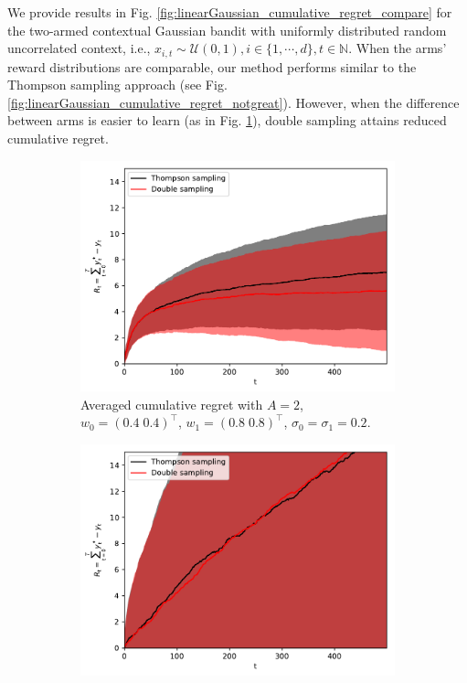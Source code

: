 \documentclass{article}
\def \Natural{{\mathbb N}}
\newcommand{\ie}{i.e., }
\newcommand{\U}{\mathcal{U}}
\begin{document}
We provide results in Fig. \ref{fig:linearGaussian_cumulative_regret_compare} for the two-armed contextual Gaussian bandit with uniformly distributed random uncorrelated context, \ie $x_{i,t}\sim \U(0,1), i \in \{1, \cdots, d\}, t \in \Natural$. When the arms' reward distributions are comparable, our method performs similar to the Thompson sampling approach (see Fig. \ref{fig:linearGaussian_cumulative_regret_notgreat}). However, when the difference between arms is easier to learn (as in Fig. \ref{fig:linearGaussian_cumulative_regret_great}), double sampling attains reduced cumulative regret.

\begin{figure}[!h]
	\centering
	\begin{subfigure}[b]{0.5\textwidth}
		\includegraphics[width=\textwidth]{./figs/linearGaussian/cumulative_regret_great.pdf}
		\caption{Averaged cumulative regret with $A=2$, \\ $w_0=(0.4 \; 0.4)^\top$, $w_1=(0.8 \; 0.8)^\top$, $\sigma_0=\sigma_1=0.2$.}
		\label{fig:linearGaussian_cumulative_regret_great}
	\end{subfigure}%
	\begin{subfigure}[b]{0.5\textwidth}
		\includegraphics[width=\textwidth]{./figs/linearGaussian/cumulative_regret_notgreat.pdf}

\end{subfigure}
\end{figure}
\end{document}
